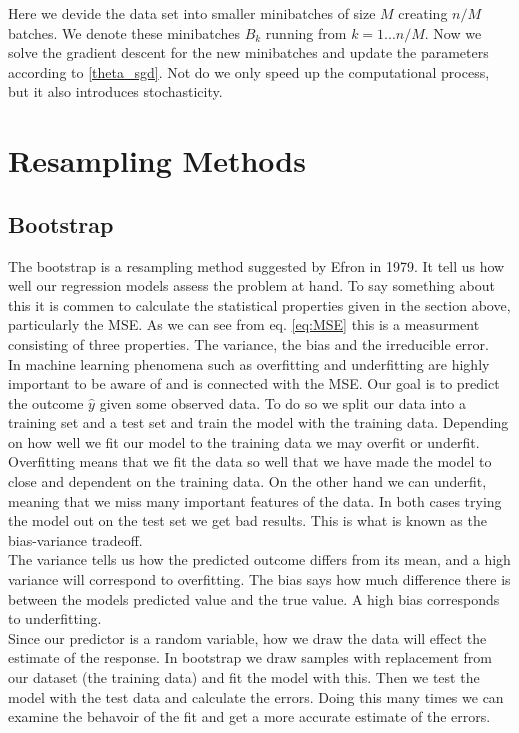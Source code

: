 \documentclass[a4paper,12pt, english]{article}
\begin{document}
Here we devide the data set into smaller minibatches of size $M$ creating $n/M$ batches. We denote these minibatches $B_k$ running from $k = 1...n/M$. Now we solve the gradient descent for the new minibatches and update the parameters according to \ref{theta_sgd}. Not do we only speed up the computational process, but it also introduces stochasticity. 

\section{Resampling Methods}

\subsection{Bootstrap}

The bootstrap is a resampling method suggested by Efron in 1979. It tell us how well our regression models assess the problem at hand. To say something about this it is commen to calculate the statistical properties given in the section above, particularly the MSE. As we can see from eq. \ref{eq:MSE} this is a measurment consisting of three properties. The variance, the bias and the irreducible error.	\\
In machine learning phenomena such as overfitting and underfitting are highly important to be aware of and is connected with the MSE. Our goal is to predict the outcome $\hat{y}$ given some observed data. To do so we split our data into a training set and a test set and train the model with the training data. Depending on how well we fit our model to the training data we may overfit or underfit. Overfitting means that we fit the data so well that we have made the model to close and dependent on the training data. 
On the other hand we can underfit, meaning that we miss many important features of the data. In both cases trying the model out on the test set we get bad results. This is what is known as the bias-variance tradeoff. \\
The variance tells us how the predicted outcome differs from its mean, and a high variance will correspond to overfitting. The bias says how much difference there is between the models predicted value and the true value. A high bias corresponds to underfitting. \\
Since our predictor is a random variable, how we draw the data will effect the estimate of the response. In bootstrap we draw samples with replacement from our dataset (the training data) and fit the model with this. Then we test the model with the test data and calculate the errors. Doing this many times we can examine the behavoir of the fit and get a more accurate estimate of the errors.
\end{document}

